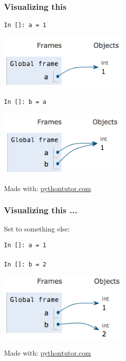 \documentclass[14pt,compress]{beamer}
\begin{document}
\begin{frame}[fragile]
  \frametitle{Visualizing this}
  \begin{minipage}{0.4\textwidth}
    \begin{lstlisting}
In []: a = 1
    \end{lstlisting}
  \end{minipage}
  \begin{minipage}{0.4\textwidth}
    \includegraphics[width=2.5in]{data/a_eq_1.png}
  \end{minipage}
\pause
  \begin{minipage}{0.4\textwidth}
    \begin{lstlisting}
In []: b = a
    \end{lstlisting}
  \end{minipage}
  \begin{minipage}{0.4\textwidth}
    \includegraphics[width=2.5in]{data/a_b_eq_1.png}
  \end{minipage}

  {\small Made with: \url{pythontutor.com}}
\end{frame}

\begin{frame}[fragile]
  \frametitle{Visualizing this ...}
  Set  to something else:

  \begin{minipage}{0.4\textwidth}
    \begin{lstlisting}
In []: a = 1

In []: b = 2
    \end{lstlisting}
  \end{minipage}
  \begin{minipage}{0.4\textwidth}
    \includegraphics[width=2.5in]{data/a_1_b_2.png}
  \end{minipage}

  \vspace*{1in}
  {\small Made with: \url{pythontutor.com}}
\end{frame}
\end{document}
